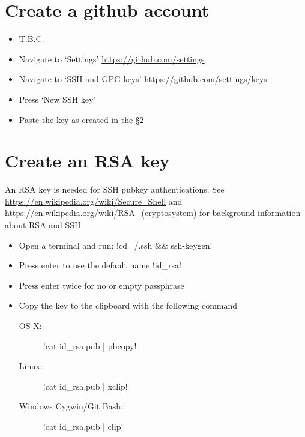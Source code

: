 \section{Create a github account}\label{sec:Create_a_github_account}

\begin{itemize}
\item T.B.C.
\item Navigate to `Settings' \url{https://github.com/settings}
\item Navigate to `SSH and GPG keys' \url{https://github.com/settings/keys}
\item Press `New SSH key'
\item Paste the key as created in the \S\ref{sec:Create_an_RSA_key}
\end{itemize}

\section{Create an RSA key}\label{sec:Create_an_RSA_key}

An RSA  key is needed for SSH  pubkey authentications. See 
\url{https://en.wikipedia.org/wiki/Secure_Shell} and
\url{https://en.wikipedia.org/wiki/RSA_(cryptosystem)} for background information
about RSA and SSH.

\begin{itemize}
\item Open a terminal and run: !cd ~/.ssh && ssh-keygen!
\item Press enter to use the default name !id_rsa!
\item Press enter twice for no or empty passphrase
\item Copy the key to the clipboard with the following command
\begin{description}
    \item[OS X:] !cat id_rsa.pub | pbcopy!
    \item[Linux:] !cat id_rsa.pub | xclip!
    \item[Windows Cygwin/Git Bash:] !cat id_rsa.pub | clip!
\end{description}
\end{itemize}

